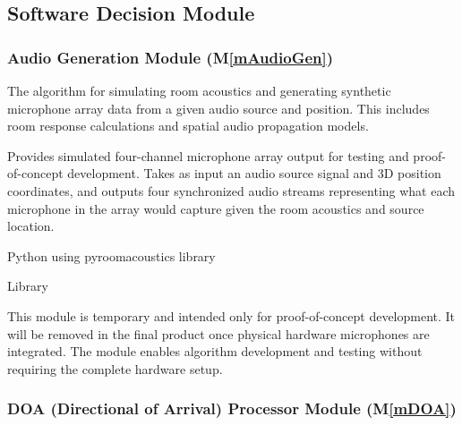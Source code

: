 \documentclass[12pt, titlepage]{article}
\newcommand{\mref}[1]{M\ref{#1}}
\begin{document}
\subsection{Software Decision Module}

\subsubsection{Audio Generation Module (\mref{mAudioGen})}

\begin{description}[labelindent=0.5cm]
\item[Secrets:] The algorithm for simulating room acoustics and generating
  synthetic microphone array data from a given audio source and position. This
  includes room response calculations and spatial audio propagation models. 
\item[Services:] Provides simulated four-channel microphone array output for
  testing and proof-of-concept development. Takes as input an audio source
  signal and 3D position coordinates, and outputs four synchronized audio
  streams representing what each microphone in the array would capture given the
  room acoustics and source location.
\item[Implemented By:] Python using pyroomacoustics library
\item[Type of Module:] Library
\item[Notes:] This module is temporary and intended only for proof-of-concept
  development. It will be removed in the final product once physical hardware
  microphones are integrated. The module enables algorithm development and
  testing without requiring the complete hardware setup.
\end{description}

\subsubsection{DOA (Directional of Arrival) Processor Module (\mref{mDOA})}
\end{document}
